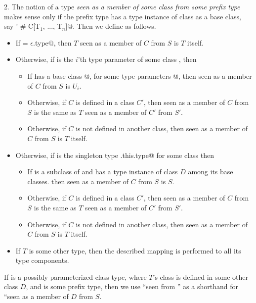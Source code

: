 \documentclass[11pt]{report}
\begin{document}
2. The notion of a type \verb@T@
{\em seen as a member of some class \verb@C@ from some prefix type
\verb@S@} makes sense only if the prefix type \verb@S@
has a type instance of class \verb@C@ as a base class, say
\verb@S' # C[T$_1$, ..., T$_n$]@. Then we define as follows.
\begin{itemize}
 \item 
  If \verb@S = $\epsilon$.type@, then $T$ seen as a member of $C$ from $S$ is $T$ itself.
 \item Otherwise, if \verb@T@ is the $i$'th type parameter of some class \verb@D@, then
   \begin{itemize}
   \item
   If \verb@S@ has a base class \verb@D[U$_1$, ..., U$_n$]@, for some type parameters
   \verb@[U$_1$, ..., U$_n$]@, then \verb@T@ seen as a member of $C$ from $S$ is $U_i$.
   \item
   Otherwise, if $C$ is defined in a class $C'$, then
   \verb@T@ seen as a member of $C$ from $S$ is the same as $T$ seen as
   a member of $C'$ from $S'$.
   \item
   Otherwise, if $C$ is not defined in another class, then  
   \verb@T@ seen as a member of $C$ from $S$ is $T$ itself.
  \end{itemize}
\item
   Otherwise, 
   if \verb@T@ is the singleton type \verb@D.this.type@ for some class \verb@D@
   then
   \begin{itemize}
   \item
   If \verb@D@ is a subclass of \verb@C@ and 
   \verb@S@ has a type instance of class $D$ among its base classes.
   then \verb@T@ seen as a member of $C$ from $S$ is $S$.
   \item
   Otherwise, if $C$ is defined in a class $C'$, then
   \verb@T@ seen as a member of $C$ from $S$ is the same as $T$ seen as
   a member of $C'$ from $S'$.
   \item
   Otherwise, if $C$ is not defined in another class, then  
   \verb@T@ seen as a member of $C$ from $S$ is $T$ itself.
   \end{itemize}
\item
  If $T$ is some other type, then the described mapping is performed
  to all its type components.
\end{itemize}

If \verb@T@ is a possibly parameterized class type, where $T$'s class
is defined in some other class $D$, and \verb@S@ is some prefix type,
then we use ``\verb@T@ seen from \verb@S@'' as a shorthand for
``\verb@T@ seen as a member of $D$ from $S$.
\end{document}
